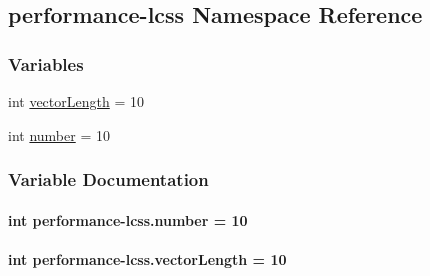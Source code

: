 \hypertarget{namespaceperformance-lcss}{\subsection{performance-\/lcss Namespace Reference}
\label{namespaceperformance-lcss}
}
\subsubsection*{Variables}
\begin{DoxyCompactItemize}
\item 
int \hyperlink{namespaceperformance-lcss_a3651923e00b4e4ba6cad877ea6d727b2}{vector\-Length} = 10
\item 
int \hyperlink{namespaceperformance-lcss_a569a16e2e051498c431c92a3fcad1a26}{number} = 10
\end{DoxyCompactItemize}


\subsubsection{Variable Documentation}
\hypertarget{namespaceperformance-lcss_a569a16e2e051498c431c92a3fcad1a26}{
\paragraph[{number}]{\setlength{\rightskip}{0pt plus 5cm}int performance-\/lcss.\-number = 10}}\label{namespaceperformance-lcss_a569a16e2e051498c431c92a3fcad1a26}
\hypertarget{namespaceperformance-lcss_a3651923e00b4e4ba6cad877ea6d727b2}{
\paragraph[{vector\-Length}]{\setlength{\rightskip}{0pt plus 5cm}int performance-\/lcss.\-vector\-Length = 10}}\label{namespaceperformance-lcss_a3651923e00b4e4ba6cad877ea6d727b2}
